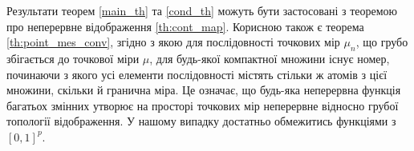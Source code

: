 Результати теорем \ref{main_th} та \ref{cond_th} можуть бути застосовані
з теоремою про неперервне відображення \ref{th:cont_map}. %
Корисною також є теорема \ref{th:point_mes_conv}, згідно з якою
для послідовності точкових мір $\mu_n$, що грубо збігається до точкової
міри $\mu$, для будь-якої компактної множини існує номер, 
починаючи з якого усі елементи послідовності містять
стільки ж атомів з цієї множини, скільки й гранична міра.
Це означає, що будь-яка неперервна функція багатьох змінних
утворює на просторі точкових мір
неперервне відносно грубої топології відображення. У нашому
випадку достатньо обмежитись функціями з $[0, 1]^p$.

